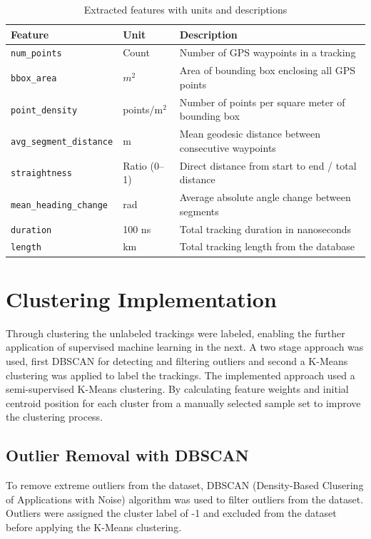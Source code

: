 \documentclass[a4paper,12pt,twoside]{scrreprt}
\begin{document}
\begin{table}[ht]
  \centering
  \begin{tabular}{|l|l|p{6.5cm}|}
    \hline
    \textbf{Feature}                & \textbf{Unit} & \textbf{Description}
    \\
    \hline
    \texttt{num\_points}            & Count         & Number of GPS waypoints
    in a tracking
    \\
    \hline
    \texttt{bbox\_area}             & $m^2$         & Area of bounding box
    enclosing all GPS points
    \\
    \hline
    \texttt{point\_density}         & points/m$^2$  & Number of points per
    square meter
    of bounding box
    \\
    \hline
    \texttt{avg\_segment\_distance} & m             & Mean geodesic distance
    between
    consecutive waypoints
    \\
    \hline
    \texttt{straightness}           & Ratio (0–1)   & Direct distance from
    start to end /
    total distance
    \\
    \hline
    \texttt{mean\_heading\_change}  & rad           & Average absolute angle
    change
    between segments
    \\
    \hline
    \texttt{duration}               & 100 ns        & Total tracking
    duration in nanoseconds
    \\
    \hline
    \texttt{length}                 & km            & Total tracking length
    from the database
    \\
    \hline
  \end{tabular}
  \caption{Extracted features with units and descriptions}
  \label{tab:feature_units}
\end{table}

\section{Clustering Implementation}
Through clustering the unlabeled trackings were labeled, enabling the further
application of supervised machine learning in the next.
A two stage approach was used, first DBSCAN for detecting and filtering
outliers and second a K-Means clustering was applied to label the trackings.
The implemented approach used a semi-supervised K-Means clustering. By
calculating feature weights and initial centroid position for each cluster from
a manually selected sample set to improve the clustering process.

\subsection{Outlier Removal with DBSCAN}
To remove extreme outliers from the dataset, DBSCAN (Density-Based Clusering
of Applications with Noise) algorithm was used to filter outliers from the
dataset.
Outliers were assigned the cluster label of -1 and excluded from the dataset
before applying the K-Means clustering.
\end{document}
